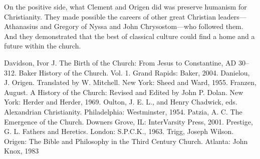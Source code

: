 On the positive side, what Clement and Origen did was preserve humanism for Christianity. They made
possible the careers of other great Christian leaders—Athanasius and Gregory of Nyssa and John
Chrysostom—who followed them. And they demonstrated that the best of classical culture could find a
home and a future within the church.

\begin{readinglist}
\entry Davidson, Ivor J. The Birth of the Church: From Jesus to Constantine, AD 30–312. Baker
  History of the Church. Vol. 1. Grand Rapids: Baker, 2004.
\entry Danielou, J. Origen. Translated by W. Mitchell. New York: Sheed and Ward, 1955.
\entry Franzen, August. A History of the Church: Revised and Edited by John P. Dolan. New York:
  Herder and Herder, 1969.
\entry Oulton, J. E. L., and Henry Chadwick, eds. Alexandrian Christianity. Philadelphia:
  Westminster, 1954.
\entry Patzia, A. C. The Emergence of the Church. Downers Grove, IL: InterVarsity Press, 2001.
\entry Prestige, G. L. Fathers and Heretics. London: S.P.C.K., 1963.
\entry *Trigg, Joseph Wilson. Origen: The Bible and Philosophy in the Third Century Church. Atlanta:
  John Knox, 1983
\end{readinglist}
